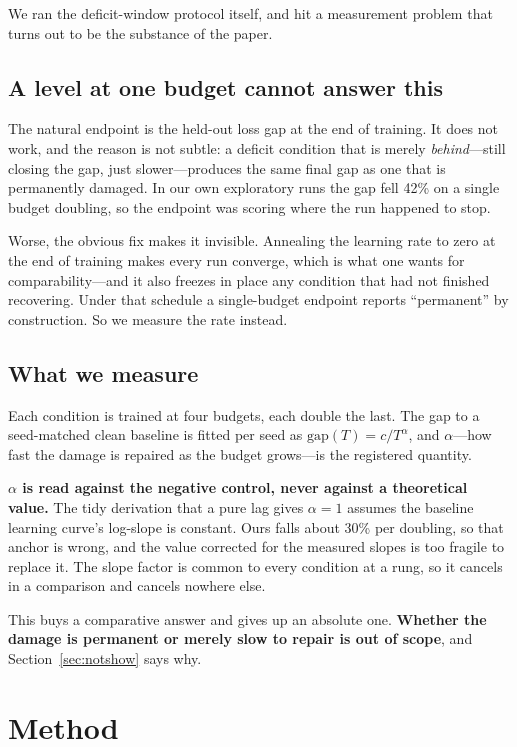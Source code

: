 \documentclass[11pt]{article}
\begin{document}
We ran the deficit-window protocol itself, and hit a measurement problem that
turns out to be the substance of the paper.

\subsection{A level at one budget cannot answer this}

The natural endpoint is the held-out loss gap at the end of training. It does not
work, and the reason is not subtle: a deficit condition that is merely
\emph{behind}---still closing the gap, just slower---produces the same final gap
as one that is permanently damaged. In our own exploratory runs the gap fell 42\%
on a single budget doubling, so the endpoint was scoring where the run happened
to stop.

Worse, the obvious fix makes it invisible. Annealing the learning rate to zero at
the end of training makes every run converge, which is what one wants for
comparability---and it also freezes in place any condition that had not finished
recovering. Under that schedule a single-budget endpoint reports ``permanent'' by
construction. So we measure the rate instead.

\subsection{What we measure}

Each condition is trained at four budgets, each double the last. The gap to a
seed-matched clean baseline is fitted per seed as $\mathrm{gap}(T) = c/T^{\alpha}$,
and $\alpha$---how fast the damage is repaired as the budget grows---is the
registered quantity.

\textbf{$\alpha$ is read against the negative control, never against a
theoretical value.} The tidy derivation that a pure lag gives $\alpha = 1$
assumes the baseline learning curve's log-slope is constant. Ours falls about
30\% per doubling, so that anchor is wrong, and the value corrected for the
measured slopes is too fragile to replace it. The slope factor is common to every
condition at a rung, so it cancels in a comparison and cancels nowhere else.

This buys a comparative answer and gives up an absolute one. \textbf{Whether the
damage is permanent or merely slow to repair is out of scope}, and
Section~\ref{sec:notshow} says why.

\section{Method}
\end{document}
